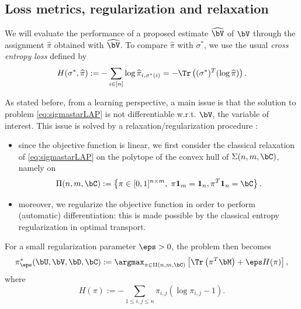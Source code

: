 \subsection*{Loss metrics, regularization and relaxation}
We will evaluate the performance of a proposed estimate $\widehat{\bV}$ of $\bV$
through the assignment $\widehat{\pi}$ obtained with $\widehat{\bV}$. To compare
$\widehat{\pi}$ with $\sigma^*$, we use the usual \emph{cross entropy loss}
defined by
\begin{equation*}
    H(\sigma^*,\widehat{\pi}) := - \sum_{i \in [n]} \log{\widehat{\pi}_{i,\sigma^*(i)}} = - \Tr\left( (\sigma^*)^T (\log \widehat{\pi}) \right).
\end{equation*}



As stated before, from a learning perspective, a main issue is that the solution
to problem \eqref{eq:sigmastarLAP} is not differentiable w.r.t. $\bV$, the
variable of interest. This issue is solved by a relaxation/regularization
procedure \cite{cuturi_sinkhorn_2013}:
\begin{itemize}
    \item since the objective function is linear, we first consider the
          classical relaxation of \eqref{eq:sigmastarLAP} on the polytope of the
          convex hull of $\Sigma(n,m,\bC)$, namely on
          \begin{equation*}\label{eq:defPi}
              \Pi(n,m,\bC) := \left\lbrace \pi \in [0,1]^{n \times m}, \; {\pi \mathbf{1}_m}  = { \mathbf{1}_n}, {\pi^T \mathbf{1}_n} = \bC \right\rbrace.
          \end{equation*}
    \item moreover, we regularize the objective function in order to perform
          (automatic) differentiation: this is made possible by the classical entropy
          regularization in optimal transport.
\end{itemize}
For a small regularization parameter $\eps>0$, the problem then becomes
\begin{equation}\label{eq:piSinkhorn}
    \pi_{\eps}^*(\bU,\bV,\bD,\bC) := \argmax_{\pi \in \Pi(n,m,\bC)} \left[\Tr\left( \pi^T \bM \right) + \eps H(\pi) \right],
\end{equation} where
\begin{equation}\label{eq:Hpi}
    H(\pi) := - \sum_{1 \leq i,j \leq n} \pi_{i,j} (\log \pi_{i,j}-1).
\end{equation}

